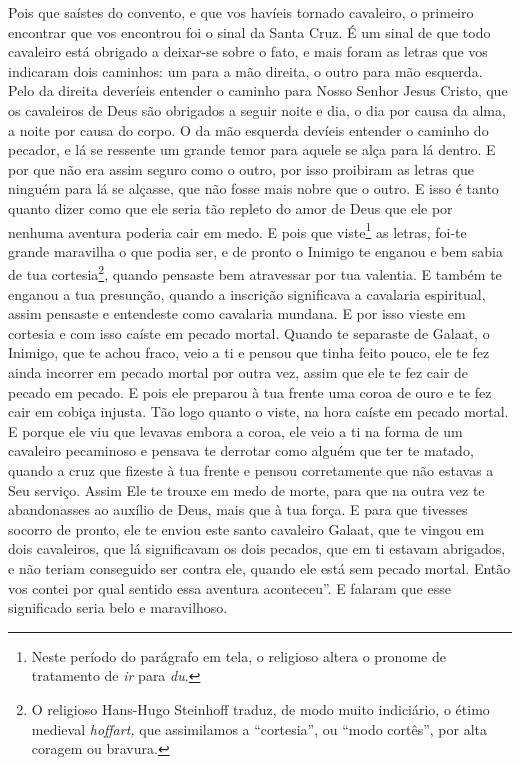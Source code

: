 Pois que saístes do convento, e que vos havíeis tornado cavaleiro, o primeiro
encontrar que vos encontrou foi o sinal da Santa Cruz. É um sinal de que todo
cavaleiro está obrigado a deixar-se sobre o fato, e mais foram as letras que
vos indicaram dois caminhos: um para a mão direita, o outro para mão esquerda.
Pelo da direita deveríeis entender o caminho para Nosso Senhor Jesus Cristo,
que os cavaleiros de Deus são obrigados a seguir noite e dia, o dia por causa
da alma, a noite por causa do corpo. O da mão esquerda devíeis entender o
caminho do pecador, e lá se ressente um grande temor para aquele se alça para
lá dentro. E por que não era assim seguro como o outro, por isso proibiram as
letras que ninguém para lá se alçasse, que não fosse mais nobre que o outro. E
isso é tanto quanto dizer como que ele seria tão repleto do amor de Deus que
ele por nenhuma aventura poderia cair em medo. E pois que viste\footnote{ Neste
período do parágrafo em tela, o religioso altera o pronome de tratamento de
\textit{ir}  para \textit{du}.}  as letras, foi-te
grande maravilha o que podia ser, e de pronto o Inimigo te enganou e bem sabia
de tua cortesia\footnote{ O religioso Hans-Hugo Steinhoff traduz, de modo muito
indiciário, o étimo medieval \textit{hoffart,} que assimilamos a “cortesia”, ou
 “modo cortês”, por alta coragem ou bravura.},  quando
pensaste bem atravessar por tua valentia. E também te enganou a tua presunção,
quando a inscrição significava a cavalaria espiritual, assim pensaste e
entendeste como cavalaria mundana. E por isso vieste em cortesia e com isso
caíste em pecado mortal. Quando te separaste de Galaat, o Inimigo, que te achou
fraco, veio a ti e pensou que tinha feito pouco, ele te fez ainda incorrer em
pecado mortal por outra vez, assim que ele te fez cair de pecado em pecado. E
pois ele preparou à tua frente uma coroa de ouro e te fez cair em cobiça
injusta. Tão logo quanto o viste, na hora caíste em pecado mortal. E porque ele
viu que levavas embora a coroa, ele veio a ti na forma de um cavaleiro
pecaminoso e pensava te derrotar como alguém que ter te matado, quando a cruz
que fizeste à tua frente e pensou corretamente que não estavas a Seu serviço.
Assim Ele te trouxe em medo de morte, para que na outra vez te abandonasses ao
auxílio de Deus, mais que à tua força. E para que tivesses socorro de pronto,
ele te enviou este santo cavaleiro Galaat, que te vingou em dois cavaleiros,
que lá significavam os dois pecados, que em ti estavam abrigados, e não teriam
conseguido ser contra ele, quando ele está sem pecado mortal. Então vos contei
por qual sentido essa aventura aconteceu”. E falaram que esse
significado seria belo e maravilhoso.

